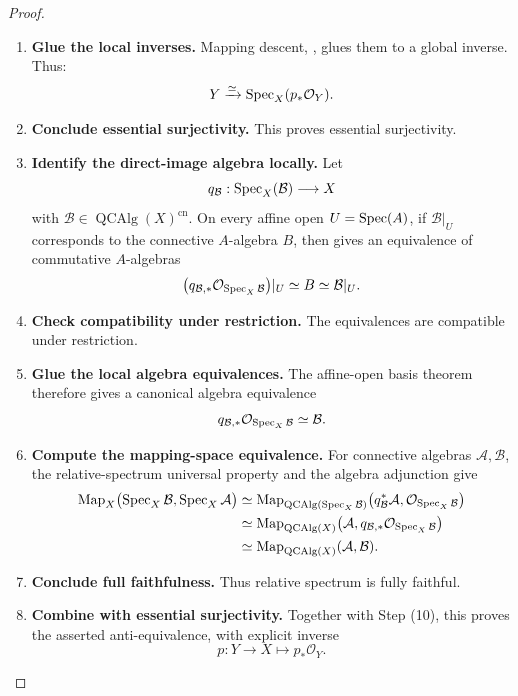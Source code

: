 \begin{proof}
\begin{enumerate}[label=\textup{(\arabic*)}]
    \item \textbf{Glue the local inverses.}
    Mapping descent,
    , glues them to a global
    inverse. Thus:
    \[
        Y\xrightarrow{\simeq}\operatorname{Spec}_X(p_*\mathcal O_Y).
    \]

    \item \textbf{Conclude essential surjectivity.}
    This proves essential surjectivity.

    \item \textbf{Identify the direct-image algebra locally.}
    Let
    \[
        q_{\mathcal B}:\operatorname{Spec}_X(\mathcal B)\longrightarrow X
    \]
    with \(\mathcal B\in\operatorname{QCAlg}(X)^{\mathrm{cn}}\). On every
    affine open \(U=\operatorname{Spec}(A)\), if \(\mathcal B|_U\) corresponds to the
    connective \(A\)-algebra \(B\), then
     gives an equivalence of
    commutative \(A\)-algebras
    \[
        \bigl(q_{\mathcal B,*}\mathcal O_{\operatorname{Spec}_X\mathcal B}\bigr)|_U
        \simeq
        B
        \simeq
        \mathcal B|_U.
    \]

    \item \textbf{Check compatibility under restriction.}
    The equivalences are compatible under restriction.

    \item \textbf{Glue the local algebra equivalences.}
    The affine-open
    basis theorem therefore gives a canonical algebra equivalence
    \[
        q_{\mathcal B,*}\mathcal O_{\operatorname{Spec}_X\mathcal B}
        \simeq
        \mathcal B.
    \]

    \item \textbf{Compute the mapping-space equivalence.}
    For connective algebras \(\mathcal A,\mathcal B\), the relative-spectrum
    universal property and the algebra adjunction give
    \[
    \begin{aligned}
        \operatorname{Map}_X
        \bigl(
            \operatorname{Spec}_X\mathcal B,
            \operatorname{Spec}_X\mathcal A
        \bigr)
        &\simeq
        \operatorname{Map}_{\operatorname{QCAlg}(\operatorname{Spec}_X\mathcal B)}
        \bigl(
            q_{\mathcal B}^*\mathcal A,
            \mathcal O_{\operatorname{Spec}_X\mathcal B}
        \bigr)
        \\
        &\simeq
        \operatorname{Map}_{\operatorname{QCAlg}(X)}
        \bigl(
            \mathcal A,
            q_{\mathcal B,*}\mathcal O_{\operatorname{Spec}_X\mathcal B}
        \bigr)
        \\
        &\simeq
        \operatorname{Map}_{\operatorname{QCAlg}(X)}(\mathcal A,\mathcal B).
    \end{aligned}
    \]

    \item \textbf{Conclude full faithfulness.}
    Thus relative spectrum is fully faithful.

    \item \textbf{Combine with essential surjectivity.}
    Together with
    Step \textup{(10)}, this proves the asserted anti-equivalence, with
    explicit inverse
    \[
        p:Y\to X
        \longmapsto
        p_*\mathcal O_Y.
    \]
\end{enumerate}
\end{proof}

